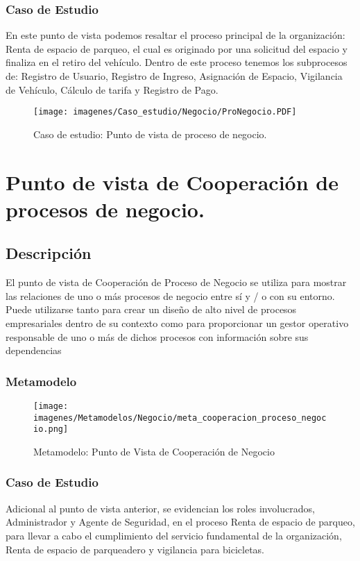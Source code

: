\subsubsection{Caso de Estudio}
En este punto de vista podemos resaltar el proceso principal de la organización: Renta de espacio de parqueo, el cual es originado por una solicitud del espacio y finaliza en el retiro del vehículo. Dentro de este proceso tenemos los subprocesos de: Registro de Usuario, Registro de Ingreso, Asignación de Espacio, Vigilancia de Vehículo, Cálculo de tarifa y Registro de Pago.

\begin{figure}[h]
	\centering
	\texttt{[image: imagenes/Caso\_estudio/Negocio/ProNegocio.PDF]}
	\caption{Caso de estudio: Punto de vista de proceso de negocio.}
	\label{fig:gap_analysis}
\end{figure}

\section{Punto de vista de Cooperación de procesos de negocio.}
\subsection{Descripción}
El punto de vista de Cooperación de Proceso de Negocio se utiliza para mostrar las relaciones de
uno o más procesos de negocio entre sí y / o con su entorno. Puede utilizarse tanto para crear un diseño
de alto nivel de procesos empresariales dentro de su contexto como para proporcionar un gestor
operativo responsable de uno o más de dichos procesos con información sobre sus dependencias

\subsubsection{Metamodelo}
\begin{figure}[h]
	\centering
	\texttt{[image: imagenes/Metamodelos/Negocio/meta\_cooperacion\_proceso\_negocio.png]}
	\caption{Metamodelo: Punto de Vista de Cooperación de Negocio}
	\label{fig:gap_analysis}
\end{figure}



\subsubsection{Caso de Estudio}
Adicional al punto de vista anterior, se evidencian los roles involucrados, Administrador y Agente de Seguridad, en el proceso Renta de espacio de parqueo, para llevar a cabo el cumplimiento del servicio fundamental de la organización, Renta de espacio de parqueadero y vigilancia para bicicletas.

